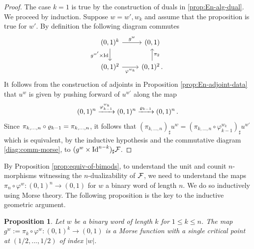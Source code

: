 \documentclass[10pt, reqno, twoside
, final
]{amsart}
\numberwithin{equation}{subsection}%
\theoremstyle{definition}
\theoremstyle{definition}
\theoremstyle{definition}
\theoremstyle{definition}
\theoremstyle{definition}
\theoremstyle{definition}
\theoremstyle{definition}
\theoremstyle{definition}
\theoremstyle{definition}
\theoremstyle{plain}
\theoremstyle{definition}
\theoremstyle{plain}
\theoremstyle{definition}
\theoremstyle{plain}
\theoremstyle{definition}
\theoremstyle{definition}
\theoremstyle{plain}
\theoremstyle{plain}
\theoremstyle{definition}
\theoremstyle{plain}
\theoremstyle{plain}
\newtheorem{prop}[defn]{Proposition}
\theoremstyle{plain}
\begin{document}
\begin{proof}
The case $k=1$ is true by the construction of duals in \cref{prop:En-alg-dual}. We proceed by induction. Suppose $w= w',w_k$ and assume that the proposition is true for $w'$.
By definition the following diagram commutes
\begin{equation}\label{diag:comm-morse}
    \begin{tikzcd}[row sep=small,column sep=small]
	{(0,1)^k} && {(0,1)} \\
	\\
	{(0,1)^2} && {(0,1)^2 \,.} 
	\arrow["{g^w}", from=1-1, to=1-3]
	\arrow["{g^{w'}\times\Id}"', from=1-1, to=3-1]
	\arrow["{\varphi^{w_k}}"', from=3-1, to=3-3]
	\arrow["{\pi_2}"', from=3-3, to=1-3]
\end{tikzcd}
\end{equation}
It follows from the construction of adjoints in Proposition \ref{prop:En-adjoint-data} that $u^w$ is given by pushing forward of $u^{w'}$ along the map
\begin{equation*}
    (0,1)^n \xrightarrow{\varphi^{w_k}_{k-1}} (0,1)^n \xrightarrow{\varrho_{k-1}} (0,1)^n \,.
\end{equation*}
Since $\pi_{k,...,n} \circ \varrho_{k-1} = \pi_{k,...,n}$, it follows that $(\pi_{k,...,n})_{\sharp}u^w = (\pi_{k,...,n} \circ \varphi^{w_k}_{k-1})_{\sharp} u^{w'}$ which is equivalent, by the inductive hypothesis and the commutative diagram \eqref{diag:comm-morse}, to $(g^{w}\times \text{Id}^{n-k})_{\sharp}\mathcal{F}$.
\end{proof}

By Proposition \ref{prop:equiv-of-bimods}, to understand the unit and counit $n$-morphisms witnessing the $n$-dualizability of $\mathcal{F}$, we need to understand the maps $\pi_{n} \circ \varphi^w:(0,1)^n\to (0,1)$ for $w$ a binary word of length $n$. We do so inductively using Morse theory. The following proposition is the key to the inductive geometric argument.

\begin{prop}\label{prop:Morse-1}
Let $w$ be a binary word of length $k$ for $1\leq k \leq n$. The map $g^w:=  \pi_k \circ \varphi^w : (0,1)^k \to (0,1)$ is a Morse function with a single critical point at $(1/2,...,1/2)$ of index $|w|$.
\end{prop}
\end{document}
